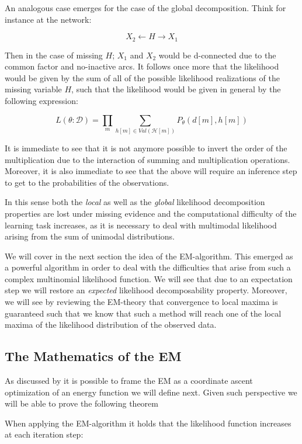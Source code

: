 \documentclass[11pt]{article}
\begin{document}
\begin{article}
An analogous case emerges for the case of the global
decomposition. Think for instance at the network:

$$ X_2 \leftarrow  H \rightarrow X_1 $$

Then in the case of missing \(H\); \(X_1\) and \(X_2\) would be
d-connected due to the common factor and no-inactive arcs. It
follows once more that the likelihood would be given by the sum of
all of the possible likelihood realizations of the missing variable
\(H\), such that the likelihood would be given in general by the
following expression:

$$ L(\theta: \mathcal{D}) = \prod_m \sum_{h[m] \in Val(\mathcal{H}[m])} P_\theta(d[m], h[m])$$

It is immediate to see that it is not anymore possible to invert
the order of the multiplication due to the interaction of summing
and multiplication operations. Moreover, it is also immediate to
see that the above will require an inference step to get to the
probabilities of the observations.

In this sense both the \emph{local} as well as the \emph{global} likelihood
decomposition properties are lost under missing evidence and the
computational difficulty of the learning task increases, as it is
necessary to deal with multimodal likelihood arising from the sum
of unimodal distributions.

We will cover in the next section the idea of the
EM-algorithm. This emerged as a powerful algorithm in order to deal
with the difficulties that arise from such a complex multinomial
likelihood function. We will see that due to an expectation step we
will restore an \emph{expected} likelihood decomposability
property. Moreover, we will see by reviewing the EM-theory that
convergence to local maxima is guaranteed such that we know that
such a method will reach one of the local maxima of the likelihood
distribution of the observed data.


\subsection{The Mathematics of the EM}
\label{math_em}
As discussed by \cite{koller2009probabilistic} it is possible to frame
the EM as a coordinate ascent optimization of an energy function we
will define next. Given such perspective we will be able to prove the
following theorem

\begin{theorem}\label{thm:one}
When applying the EM-algorithm it holds that the likelihood function increases at each iteration step:


\end{theorem}
\end{article}
\end{document}
